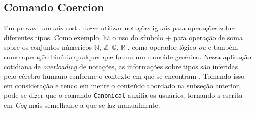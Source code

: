 \subsection{Comando Coercion} \label{subsection:coercion}

Em provas manuais costuma-se utilizar notações iguais para operações sobre diferentes tipos. Como exemplo, há o uso do símbolo $+$ para operação de soma sobre os conjuntos númericos $\mathbb{N}$, $\mathbb{Z}$, $\mathbb{Q}$, $\mathbb{R}$ , como operador lógico \textit{ou} e também como operação binária qualquer que forma um monoide genérico. Nessa aplicação cotidiana de \textit{overloading} de notações, as informações sobre tipos são inferidas pelo cérebro humano conforme o contexto em que se encontram \cite{10.1007/978-3-642-39634-2_5}. 
Tomando isso em consideração e tendo em mente o conteúdo abordado na subseção anterior, pode-se dizer que o comando \lstinline[language = coq]$Canonical$ auxilia os usuários, tornando a escrita em \textit{Coq} mais semelhante a que se faz manualmente.

